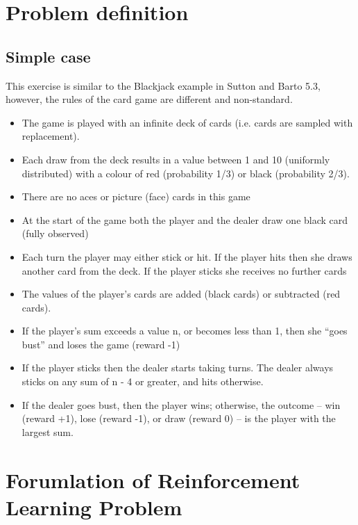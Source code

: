 \documentclass[12pt,a4paper]{article}
\begin{document}
\newpage
\section{Problem definition}

\subsection{Simple case}
This exercise is similar to the Blackjack
example in Sutton and Barto 5.3\cite{Sutton:1998:IRL:551283}, however, the rules of the
card game are different and non-standard.
\begin{itemize}
\item The game is played with an infinite deck of cards (i.e. cards are sampled
with replacement). 
\item Each draw from the deck results in a value between 1 and 10 (uniformly
distributed) with a colour of red (probability 1/3) or black (probability
2/3). 
\item There are no aces or picture (face) cards in this game
\item At the start of the game both the player and the dealer draw one black
card (fully observed)
\item Each turn the player may either stick or hit. If the player hits then she draws another card from the deck. If the player sticks she receives no further cards
\item The values of the player’s cards are added (black cards) or subtracted (red
cards). 
\item If the player’s sum exceeds a value n, or becomes less than 1, then she “goes
bust” and loses the game (reward -1)
\item If the player sticks then the dealer starts taking turns. The dealer always
sticks on any sum of n - 4 or greater, and hits otherwise.
\item If the dealer goes
bust, then the player wins; otherwise, the outcome – win (reward +1),
lose (reward -1), or draw (reward 0) – is the player with the largest sum.
\end{itemize} 
\newpage

\section{Forumlation of Reinforcement Learning Problem}
\end{document}
